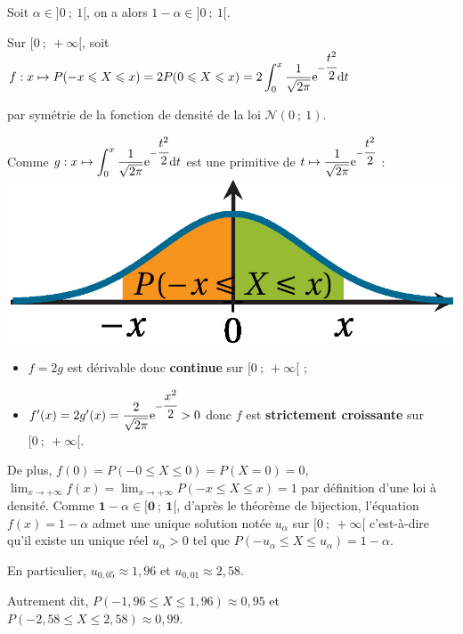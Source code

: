 \documentclass{cornouaille}
\begin{document}
\begin{preuve}
Soit $\alpha\in]0\ ;\ 1[$, on a alors $1-\alpha\in]0\ ;\ 1[$.



Sur $[0\ ;\ +\infty[$, soit $f:x\mapsto P(-x\leqslant X\leqslant x)=2P(0\leqslant X\leqslant x)=2\displaystyle\int_{0}^{x}\dfrac{1}{\sqrt{2\pi}}\textrm{e}^{-\cfrac{t^2}{2}}\textrm{d}t$


par symétrie de la fonction de densité de la loi $\mathcal{N}(0\ ;\ 1)$.



Comme $g:x\mapsto \displaystyle\int_{0}^{x}\dfrac{1}{\sqrt{2\pi}}\textrm{e}^{-\cfrac{t^2}{2}}\textrm{d} t$ est une primitive de $t\mapsto \dfrac{1}{\sqrt{2\pi}}\textrm{e}^{-\cfrac{t^2}{2}}$ : 
\includegraphics{./TS-Variables-9}



\begin{itemize}
\item $f=2g$ est dérivable donc \textbf{continue} sur $[0\ ;\ +\infty[$ ;


\item $f'(x)=2g'(x)=\dfrac{2}{\sqrt{2\pi}}\textrm{e}^{-\cfrac{x^2}{2}}>0$ donc $f$ est \textbf{strictement croissante} sur $[0\ ;\ +\infty[$.
\end{itemize}


De plus, $f(0)=P(-0\leqslant X\leqslant 0)=P(X=0)=0$,
${\displaystyle\lim_{x\rightarrow +\infty} f(x)=\lim_{x\rightarrow
+\infty} P(-x\leqslant X\leqslant x)=1}$
par définition d'une loi à densité. Comme
$\mathbf{1-}\alpha\mathbf{\in[0\ ;\ 1[}$, d'après le théorème de
bijection, l'équation $f(x)=1-\alpha$ admet une unique solution notée
$u_{\alpha}$ sur $[0\ ;\ +\infty[$ c'est-à-dire qu'il existe un unique
réel $u_{\alpha}> 0$ tel que
$P(-u_{\alpha}\leqslant X\leqslant u_{\alpha})=1-\alpha$.
\end{preuve}



\begin{valeurspart}En particulier, $u_{0,05} \approx 1,96$ et $u_{0,01}\approx 2,58$.

Autrement dit, $P(-1,96\leqslant X\leqslant 1,96)\approx 0,95$ et $P(-2,58\leqslant X\leqslant 2,58)\approx 0,99$.
\end{valeurspart}
\end{document}
